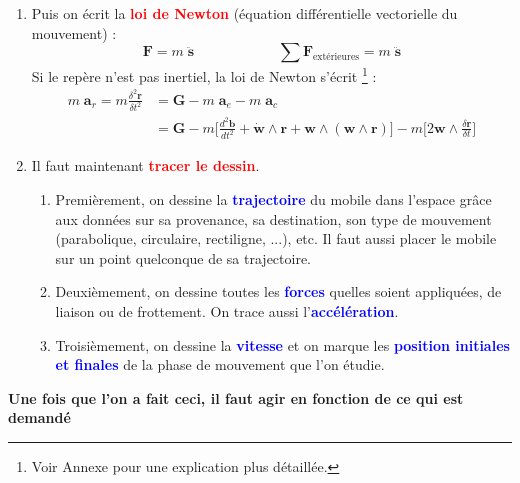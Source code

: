 \documentclass[a4paper]{article}
\begin{document}
\begin{enumerate}
\item Puis on écrit la \textcolor{red}{\textbf{loi de Newton}} (équation différentielle vectorielle du mouvement) : 
\[ \textbf{F} = m \; \ddot{\textbf{s}} \qquad \qquad \qquad \sum \textbf{F}_{\text{extérieures}} = m \; \ddot{\textbf{s}} \]
Si le repère n'est pas inertiel, la loi de Newton s'écrit \footnote{Voir Annexe pour une explication plus détaillée.} : 
\[ \begin{aligned} m \; \textbf{a}_r = m \frac{\delta^2 \textbf{r}}{\delta t^2} &= \textbf{G} - m \; \textbf{a}_e - m \; \textbf{a}_c \\ &= \textbf{G} - m \Big[ \frac{d^2 \textbf{b}}{d t^2} + \dot{\textbf{w}} \wedge \textbf{r} + \textbf{w} \wedge (\textbf{w} \wedge \textbf{r}) \Big] - m \Big[ 2 \textbf{w} \wedge \frac{\delta \textbf{r}}{\delta t} \Big] \end{aligned} \]





\item Il faut maintenant \textcolor{red}{\textbf{tracer le dessin}}.
\begin{enumerate}
\item Premièrement, on dessine la \textcolor{blue}{\textbf{trajectoire}} du mobile dans l'espace grâce aux données sur sa provenance, sa destination, son type de mouvement (parabolique, circulaire, rectiligne, ...), etc. Il faut aussi placer le mobile sur un point quelconque de sa trajectoire.
\item Deuxièmement, on dessine toutes les \textcolor{blue}{\textbf{forces}} quelles soient appliquées, de liaison ou de frottement. On trace aussi l'\textcolor{blue}{\textbf{accélération}}.
\item Troisièmement, on dessine la \textcolor{blue}{\textbf{vitesse}} et on marque les \textcolor{blue}{\textbf{position initiales et finales}} de la phase de mouvement que l'on étudie.
\end{enumerate}

\end{enumerate}






\begin{center} \textbf{Une fois que l'on a fait ceci, il faut agir en fonction de ce qui est demandé} \end{center}
\end{document}
